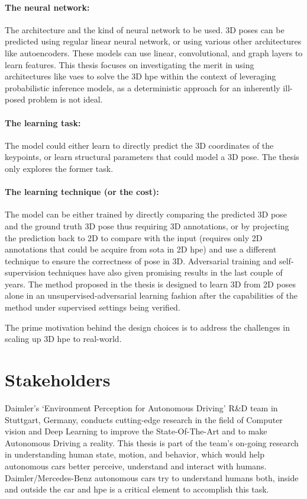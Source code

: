 \paragraph{The neural network:} The architecture and the kind of neural network to be used. 3D poses can be predicted using regular linear neural network, or using various other architectures like autoencoders. These models can use linear, convolutional, and graph layers to learn features. This thesis focuses on investigating the merit in using architectures like \acp{vae} to solve the 3D \ac{hpe} within the context of leveraging probabilistic inference models, as a deterministic approach for an inherently ill-posed problem is not ideal.

\paragraph{The learning task:} The model could either learn to directly predict the 3D coordinates of the keypoints, or learn structural parameters that could model a 3D pose. The thesis only explores the former task.

\paragraph{The learning technique (or the cost):} The model can be either trained by directly comparing the predicted 3D pose and the ground truth 3D pose thus requiring 3D annotations, or by projecting the prediction back to 2D to compare with the input (requires only 2D annotations that could be acquire from \ac{sota} in 2D \ac{hpe}) and use a different technique to ensure the correctness of pose in 3D. Adversarial training and self-supervision techniques have also given promising results in the last couple of years. The method proposed in the thesis is designed to learn 3D from 2D poses alone in an unsupervised-adversarial learning fashion after the capabilities of the method under supervised settings being verified.

The prime motivation behind the design choices is to address the challenges in scaling up 3D \ac{hpe} to real-world.

\section{Stakeholders}
\label{sec:stakeholders}
Daimler’s ‘Environment Perception for Autonomous Driving’ R\&D team in Stuttgart, Germany, conducts cutting-edge research in the field of Computer vision and Deep Learning to improve the State-Of-The-Art and to make Autonomous Driving a reality. This thesis is part of the team’s on-going research in understanding human state, motion, and behavior, which would help autonomous cars better perceive, understand and interact with humans. Daimler/Mercedes-Benz autonomous cars try to understand humans both, inside and outside the car and \ac{hpe} is a critical element to accomplish this task.

